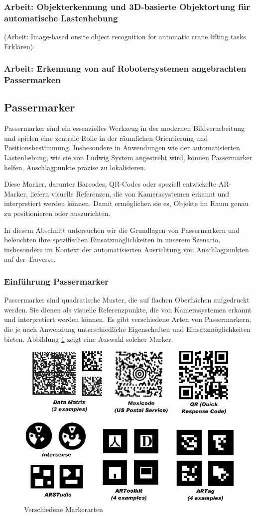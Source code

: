 \subsubsection{Arbeit: Objekterkennung und 3D-basierte Objektortung für automatische Lastenhebung}
(Arbeit: Image-based onsite object recognition for automatic crane lifting tasks\cite{zhou_image-based_2021} Erklären)

\subsubsection{Arbeit: Erkennung von auf Robotersystemen angebrachten Passermarken}

\subsection{Passermarker}
Passermarker sind ein essenzielles Werkzeug in der modernen Bildverarbeitung und spielen eine 
zentrale Rolle in der räumlichen Orientierung und Positionsbestimmung. Insbesondere in Anwendungen 
wie der automatisierten Lastenhebung, wie sie von Ludwig System angestrebt wird, können Passermarker 
helfen, Anschlagpunkte präzise zu lokalisieren.

Diese Marker, darunter Barcodes, QR-Codes oder speziell entwickelte AR-Marker, liefern visuelle 
Referenzen, die von Kamerasystemen erkannt und interpretiert werden können. Damit ermöglichen sie es, 
Objekte im Raum genau zu positionieren oder auszurichten.

In diesem Abschnitt untersuchen wir die Grundlagen von Passermarkern und beleuchten ihre spezifischen 
Einsatzmöglichkeiten in unserem Szenario, insbesondere im Kontext der automatisierten Ausrichtung von 
Anschlagpunkten auf der Traverse.

\subsubsection{Einführung Passermarker}
Passermarker sind quadratische Muster, die auf flachen Oberflächen aufgedruckt werden. 
Sie dienen als visuelle Referenzpunkte, die von Kamerasystemen erkannt und interpretiert 
werden können. Es gibt verschiedene Arten von Passermarkern, die je nach Anwendung 
unterschiedliche Eigenschaften und Einsatzmöglichkeiten bieten. 
Abbildung \ref{fig:marker_types} zeigt eine Auswahl solcher Marker.

\begin{figure}[H]
    \centering
    \includegraphics[width=0.5\linewidth]{graphics/marker_arten.png}
    \caption{Verschiedene Markerarten}
    \label{fig:marker_types}
\end{figure}

